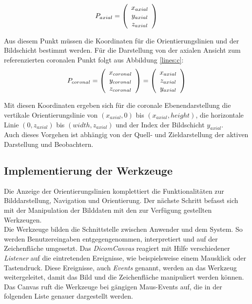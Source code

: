 \begin{equation}
P_{axial}=\left(\begin{array}{c} x_{axial} \\ y_{axial} \\ z_{axial} \end{array}\right) 
\vspace{0.5cm}
\end{equation}

\pagebreak

Aus diesem Punkt müssen die Koordinaten für die Orientierungslinien und der Bildschicht bestimmt werden.
Für die Darstellung von der axialen Ansicht zum referenzierten coronalen Punkt folgt aus Abbildung \ref{lines:c}:
\begin{equation}
P_{coronal}=\left(\begin{array}{c} x_{coronal} \\ y_{coronal} \\ z_{coronal} \end{array}\right) =
\left(\begin{array}{c} x_{axial} \\ z_{axial} \\ y_{axial} \end{array}\right)
\vspace{0.5cm}
\end{equation}

Mit diesen Koordinaten ergeben sich für die coronale Ebenendarstellung die vertikale Orientierungslinie von $(x_{axial}, 0)$ bis $(x_{axial}, height)$, die horizontale Linie $(0, z_{axial})$ bis $(width, z_{axial})$ und der Index der Bildschicht $y_{axial}$.\\
Auch dieses Vorgehen ist abhängig von der Quell- und Zieldarstellung der aktiven Darstellung und Beobachtern.

\FloatBarrier
\subsection{Implementierung der Werkzeuge}

Die Anzeige der Orientierungslinien komplettiert die Funktionalitäten zur Bilddarstellung, Navigation und Orientierung. Der nächste Schritt befasst sich mit der Manipulation der Bilddaten mit den zur Verfügung gestellten Werkzeugen.\\
Die Werkzeuge bilden die Schnittstelle zwischen Anwender und dem System. So werden Benutzereingaben entgegengenommen, interpretiert und auf der Zeichenfläche umgesetzt. Das \textit{DicomCanvas} reagiert mit Hilfe verschiedener \textit{Listener} auf die eintretenden Ereignisse, wie beispielsweise einem Mausklick oder Tastendruck. Diese Ereignisse, auch \textit{Events} genannt, werden an das Werkzeug weitergeleitet, damit das Bild und die Zeichenfläche manipuliert werden können. Das Canvas ruft die Werkzeuge bei gängigen Maus-Events auf, die in der folgenden Liste genauer dargestellt werden.

